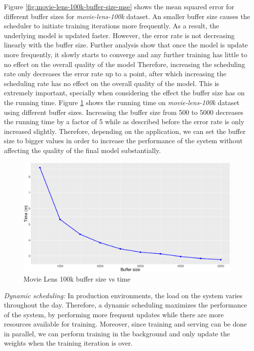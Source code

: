 \documentclass{vldb}
\begin{document}
Figure \ref{fig:movie-lens-100k-buffer-size-mse} shows the mean squared error for different buffer sizes for \textit{movie-lens-100k} dataset. 
An smaller buffer size causes the scheduler to initiate training iterations more frequently.
As a result, the underlying model is updated faster.
However, the error rate is not decreasing linearly with the buffer size.
Further analysis show that once the model is update more frequently, it slowly starts to converge and any further training has little to no effect on the overall quality of the model
Therefore, increasing the scheduling rate only decreases the error rate up to a point, after which increasing the scheduling rate has no effect on the overall quality of the model.
This is extremely important, specially when considering the effect the buffer size has on the running time.
Figure \ref{fig:movie-lens-100k-buffer-size-time} shows the running time on \textit{movie-lens-100k} dataset using different buffer sizes. 
Increasing the buffer size from 500 to 5000 decreases the running time by a factor of 5 while as described before the error rate is only increased slightly.
Therefore, depending on the application, we can set the buffer size to bigger values in order to increase the performance of the system without affecting the quality of the final model substantially.

\begin{figure}[H]
\centering
\includegraphics[width=\columnwidth]{../images/experiment-results/movie-lens-100k-buffer-time-improved.eps}
\caption{Movie Lens 100k buffer size vs time}
\label{fig:movie-lens-100k-buffer-size-time}
\end{figure}

\textit{Dynamic scheduling:} In production environments, the load on the system varies throughout the day. 
Therefore, a dynamic scheduling maximizes the performance of the system, by performing more frequent updates while there are more resources available for training. 
Moreover, since training and serving can be done in parallel, we can perform training in the background and only update the weights when the training iteration is over. 
\end{document}
